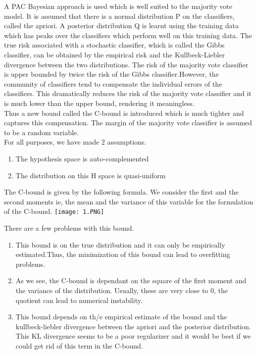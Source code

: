 \documentclass[11pt]{article}
\begin{document}
A PAC Bayesian approach is used which is well suited to the majority vote model. It is assumed that there is a normal distribution P on the classifiers, called the apriori. A posterior distribution Q is learnt using the training data which has peaks over the classifiers which perform well on this training data. The true risk associated with a stochastic classifier, which is called the Gibbs classifier, can be obtained by the empirical risk and the Kullbeck-Liebler divergence between the two distributions. The risk of the majority vote classifier is upper bounded by twice the risk of the Gibbs classifier.However, the community of classifiers tend to compensate the individual errors of the classifiers. This dramatically reduces the risk of the majority vote classifier and it is much lower than the upper bound, rendering it meaningless.\\Thus a new bound called the C-bound is introduced which is much tighter and captures this compensation. The margin of the majority vote classifier is assumed to be a random variable. \\
For all purposes, we have made 2 assumptions.
\begin{enumerate}
\item The hypothesis space is auto-complemented 
\item The distribution on this H space is quasi-uniform
\end{enumerate}

\hspace{-13mm}The C-bound is given by the following formula. We consider the first and the second moments ie, the mean and the variance of this variable for the formulation of the C-bound.
\texttt{[image: 1.PNG]}


\hspace{-14mm}There are a few problems with this bound.\\
\begin{enumerate}
\item This bound is on the true distribution and it can only be empirically estimated.Thus, the minimization of this bound can lead to overfitting problems.
\item As we see, the C-bound is dependant on the square of the first moment and the variance of the distribution. Usually, these are very close to 0, the quotient can lead to numerical instability.
\item This bound depends on th/e empirical estimate of the bound and the kullbeck-liebler divergence between the apriori and the posterior distribution. This KL divergence seems to be a poor regularizer and it would be best if we could get rid of this term in the C-bound.
\end{enumerate}
\end{document}
